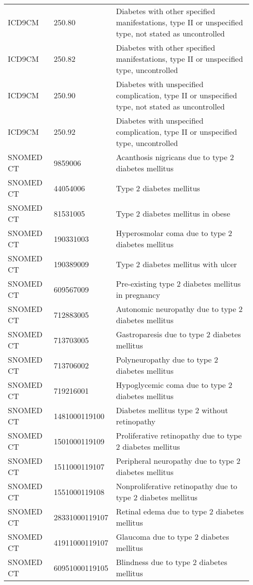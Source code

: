 \begin{longtable}{p{}p{}p{}}
  ICD9CM & 250.80 & Diabetes with other specified manifestations, type II or unspecified type, not stated as uncontrolled \\ 
  ICD9CM & 250.82 & Diabetes with other specified manifestations, type II or unspecified type, uncontrolled \\ 
  ICD9CM & 250.90 & Diabetes with unspecified complication, type II or unspecified type, not stated as uncontrolled \\ 
  ICD9CM & 250.92 & Diabetes with unspecified complication, type II or unspecified type, uncontrolled \\ 
  SNOMED CT & 9859006 & Acanthosis nigricans due to type 2 diabetes mellitus \\ 
  SNOMED CT & 44054006 & Type 2 diabetes mellitus \\ 
  SNOMED CT & 81531005 & Type 2 diabetes mellitus in obese \\ 
  SNOMED CT & 190331003 & Hyperosmolar coma due to type 2 diabetes mellitus \\ 
  SNOMED CT & 190389009 & Type 2 diabetes mellitus with ulcer \\ 
  SNOMED CT & 609567009 & Pre-existing type 2 diabetes mellitus in pregnancy \\ 
  SNOMED CT & 712883005 & Autonomic neuropathy due to type 2 diabetes mellitus \\ 
  SNOMED CT & 713703005 & Gastroparesis due to type 2 diabetes mellitus \\ 
  SNOMED CT & 713706002 & Polyneuropathy due to type 2 diabetes mellitus \\ 
  SNOMED CT & 719216001 & Hypoglycemic coma due to type 2 diabetes mellitus \\ 
  SNOMED CT & 1481000119100 & Diabetes mellitus type 2 without retinopathy \\ 
  SNOMED CT & 1501000119109 & Proliferative retinopathy due to type 2 diabetes mellitus \\ 
  SNOMED CT & 1511000119107 & Peripheral neuropathy due to type 2 diabetes mellitus \\ 
  SNOMED CT & 1551000119108 & Nonproliferative retinopathy due to type 2 diabetes mellitus \\ 
  SNOMED CT & 28331000119107 & Retinal edema due to type 2 diabetes mellitus \\ 
  SNOMED CT & 41911000119107 & Glaucoma due to type 2 diabetes mellitus \\ 
  SNOMED CT & 60951000119105 & Blindness due to type 2 diabetes mellitus \\ 

\end{longtable}
